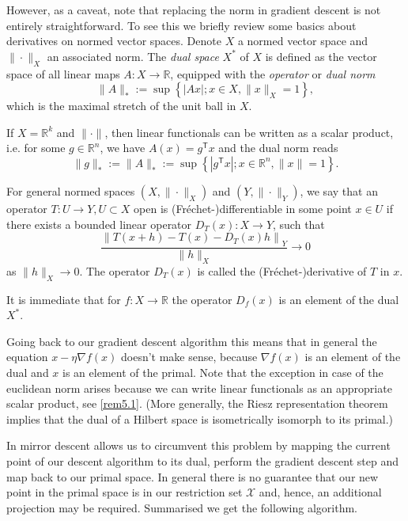 However, as a caveat, note that replacing the norm in gradient descent is not entirely straightforward. To see this we briefly review some basics about derivatives on normed vector spaces. Denote $X$ a normed vector space and $\|\cdot \|_X$ an associated norm. The \emph{dual space} $X^*$ of $X$ is defined as the vector space of all linear maps $A\colon X\rightarrow \mathbb{R}$, equipped with the \emph{operator} or \emph{dual norm}
\begin{equation*}
	\|A\|_* := \sup\left\{|Ax|; x\in X, \|x\|_X = 1 \right\},
\end{equation*}
which is the maximal stretch of the unit ball in $X$.
\begin{remark}\label{rem5.1}
If $X = \mathbb{R}^k$ and $\|\cdot\|$, then linear functionals can be written as a scalar product, i.e. for some $g\in \mathbb{R}^n$, we have $A(x) = g^\mathsf{T}x$ and the dual norm reads
\begin{equation*}
	\|g\|_* := \|A\|_* :=  \sup\left\{|g^\mathsf{T}x|; x\in \mathbb{R}^n, \|x\| = 1 \right\}.
\end{equation*}
\end{remark}
\begin{definition}
For general normed spaces $(X, \|\cdot\|_X)$ and $(Y,\|\cdot\|_Y)$, we say that an operator $T\colon U \rightarrow Y, U\subset X$ open is (Fréchet-)differentiable in some point $x \in U$ if there exists a bounded linear operator $D_T(x)\colon X \rightarrow Y$, such that
\begin{equation*}
	\frac{\left\|T(x + h) - T(x) - D_T(x)h\right\|_Y}{\|h\|_X} \rightarrow 0
\end{equation*}
as $\|h\|_X \rightarrow 0$. The operator $D_T(x)$ is called the (Fréchet-)derivative of $T$ in $x$.
\end{definition}
It is immediate that for $f\colon X \rightarrow \mathbb{R}$ the operator $D_f(x)$ is an element of the dual $X^*$.

Going back to our gradient descent algorithm this means that in general the equation $x - \eta \nabla f(x)$ doesn't make sense, because $\nabla f(x)$ is an element of the dual and $x$ is an element of the primal. 
Note that the exception in case of the euclidean norm arises because we can write linear functionals as an appropriate scalar product, see \autoref{rem5.1}. (More generally, the Riesz representation theorem implies that the dual of a Hilbert space is isometrically isomorph to its primal.)

In mirror descent allows us to circumvent this problem by mapping the current point of our descent algorithm to its dual, perform the gradient descent step and map back to our primal space. In general there is no guarantee that our new point in the primal space is in our restriction set $\mathcal{X}$ and, hence, an additional projection may be required. Summarised we get the following algorithm.

